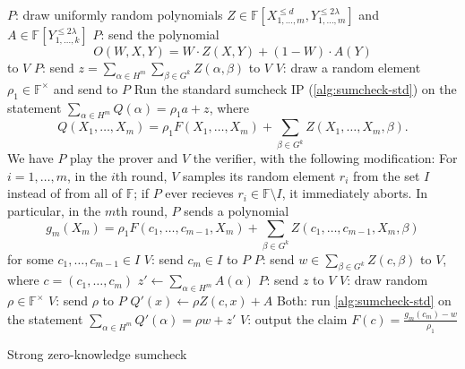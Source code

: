\documentclass[english]{reedthesis}
\theoremstyle{plain}
\theoremstyle{definition}
\theoremstyle{remark}
\begin{document}
\begin{algorithm}[htbp]
  $P$: draw uniformly random polynomials
  $Z \in \mathbb{F}[X_{1, \ldots, m}^{\le d}, Y_{1, \ldots, m}^{\le 2\lambda}]$ and
  $A \in \mathbb{F}[Y_{1, \ldots, k}^{\le 2\lambda}]$\;
  $P$: send the polynomial
  \[
    O(W, X, Y) = W \cdot Z(X, Y) + (1 - W) \cdot A(Y)
  \]
  to $V$\;
  $P$: send $z = \sum_{\alpha \in H^{m}}\sum_{\beta \in G^{k}}Z(\alpha, \beta)$ to $V$\;
  $V$: draw a random element $\rho_{1} \in \mathbb{F}^{\times}$ and send to $P$\;
  Run the standard sumcheck IP (\cref{alg:sumcheck-std}) on the statement
  $\sum_{\alpha \in H^{m}}Q(\alpha) = \rho_{1}a + z$, where
  \[
    Q(X_{1}, \ldots, X_{m}) = \rho_{1}F(X_{1}, \ldots, X_{m}) + \sum_{\beta \in G^{k}}Z(X_{1}, \ldots, X_{m}, \beta).
  \]
  We have $P$ play the prover and $V$ the verifier, with the following
  modification: For $i = 1, \ldots, m$, in the $i$th round, $V$ samples its random
  element $r_{i}$ from the set $I$ instead of from all of $\mathbb{F}$; if $P$
  ever recieves $r_{i} \in \mathbb{F} \setminus I$, it immediately aborts. In particular,
  in the $m$th round, $P$ sends a polynomial
  \[
    g_{m}(X_{m}) = \rho_{1}F(c_{1}, \ldots, c_{m-1}, X_{m}) + \sum_{\beta \in G^{k}}Z(c_{1}, \ldots, c_{m-1}, X_{m}, \beta)
  \]
  for some $c_{1}, \ldots, c_{m-1} \in I$\;
  $V$: send $c_{m} \in I$ to $P$\;
  $P$: send $w \in \sum_{\beta \in G^{k}}Z(c, \beta)$ to $V$, where $c = (c_{1}, \ldots, c_{m})$\;
  $z' \leftarrow \sum_{\alpha \in H^{m}}A(\alpha)$\;
  $P$: send $z$ to $V$\;
  $V$: draw random $\rho \in \mathbb{F}^{\times}$\;
  $V$: send $\rho$ to $P$\;
  $Q'(x) \leftarrow \rho Z(c, x) + A$\;
  Both: run \cref{alg:sumcheck-std} on the statement $\sum_{\alpha \in H^{m}}Q'(\alpha) = \rho w + z'$\;
  $V$: output the claim $F(c) = \frac{g_{m}(c_{m}) - w}{\rho_{1}}$\;
  \caption{Strong zero-knowledge sumcheck~\cite[Construction 3]{CFGS22}}\label{alg:zk-sumcheck}
\end{algorithm}
\end{document}
